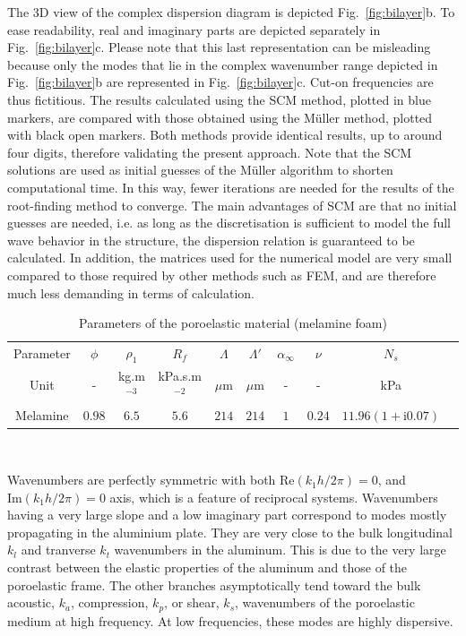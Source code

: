 The 3D view of the complex dispersion diagram is depicted Fig.~\ref{fig:bilayer}b. To ease readability, real and imaginary parts are depicted separately in Fig.~\ref{fig:bilayer}c. Please note that this last representation can be misleading because only the modes that lie in the complex wavenumber range depicted in Fig.~\ref{fig:bilayer}b are represented in Fig.~\ref{fig:bilayer}c. Cut-on frequencies are thus fictitious. The results calculated using the SCM method, plotted in blue markers, are compared with those obtained using the M\"uller method, plotted with black open markers. Both methods provide identical results, up to around four digits, therefore validating the present approach. Note that the SCM solutions are used as initial guesses of the M\"uller algorithm to shorten computational time. In this way, fewer iterations are needed for the results of the root-finding method to converge. The main advantages of SCM are that no initial guesses are needed, i.e. as long as the discretisation is sufficient to model the full wave behavior in the structure, the dispersion relation is guaranteed to be calculated. In addition, the matrices used for the numerical model are very small compared to those required by other methods such as FEM, and are therefore much less demanding in terms of calculation.\\
    \begin{table}
        \centering
        \label{tab:poroelastic_paramsJAP}
        
        \begin{tabular}{cccccccccc}
            \hline
            Parameter  & $\phi$ & $\rho_1$    & $R_f$          & $\Lambda$ & $\Lambda'$ & $\alpha_\infty$ & $\nu$  & $N_s$    \\
            Unit       & -      & kg.m$^{-3}$ & kPa.s.m$^{-2}$ & $\mu$m    & $\mu$m     & -               & -      & kPa            \\
            \hline
            Melamine   & $0.98$ & $6.5$       & $5.6$          & $214$     & $214$      & $1$             & $0.24$ & $11.96\left(1+\textrm{i0.07} \right)$     \\
            \hline
        \end{tabular}\\[2em]        
        \caption{Parameters of the poroelastic material (melamine foam)}
        \end{table}

    Wavenumbers are perfectly symmetric with both $\textrm{Re}\left(k_1h/2\pi \right)=0$, and $\textrm{Im}\left(k_1h/2\pi \right)=0$ axis, which is a feature of reciprocal systems. Wavenumbers having a very large slope and a low imaginary part correspond to modes mostly propagating in the aluminium plate. They are very close to the bulk longitudinal $k_l$ and tranverse $k_t$ wavenumbers in the aluminum. This is due to the very large contrast between the elastic properties of the aluminum and those of the poroelastic frame. The other branches asymptotically tend toward the bulk acoustic, $k_a$, compression, $k_p$, or shear, $k_s$, wavenumbers of the poroelastic medium at high frequency. At low frequencies, these modes are highly dispersive. \\
    
